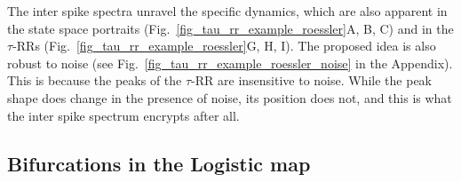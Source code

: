 \documentclass[entropy,article,submit,pdftex,moreauthors]{Definitions/mdpi}
\begin{document}
The inter spike spectra unravel the specific dynamics, which are also apparent in the state space portraits (Fig.~\ref{fig_tau_rr_example_roessler}A, B, C) and in the 
$\tau$-RRs (Fig.~\ref{fig_tau_rr_example_roessler}G, H, I). The proposed idea is also 
robust to noise (see Fig.~\ref{fig_tau_rr_example_roessler_noise} in the Appendix). This is because the peaks of the $\tau$-RR are insensitive to noise. While the peak shape does 
change in the presence of noise, its position does not, and this is what the inter spike spectrum encrypts after all.



\subsection{Bifurcations in the Logistic map}
\end{document}
